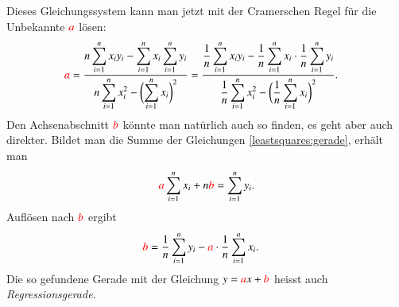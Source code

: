 Dieses Gleichungssystem kann man jetzt mit der Cramerschen Regel für die
Unbekannte ${\color{red}a}$ lösen:
\begin{align*}
{\color{red}a}
&=
\frac{\displaystyle
n\sum_{i=1}^n x_iy_i-\sum_{i=1}^nx_i\sum_{i=1}^ny_i
}{\displaystyle
n\sum_{i=1}^n x_i^2 -\biggl(\sum_{i=1}^n x_i\biggr)^2
}
=
\frac{\displaystyle
\frac1n\sum_{i=1}^n x_iy_i-\frac1n\sum_{i=1}^nx_i\cdot \frac1n\sum_{i=1}^ny_i
}{\displaystyle
\frac1n\sum_{i=1}^n x_i^2 -\biggl(\frac1n\sum_{i=1}^n x_i\biggr)^2
}.
\end{align*}
Den Achsenabschnitt $\color{red}b$ könnte man natürlich auch so finden,
es geht aber auch direkter.
Bildet man die Summe der Gleichungen 
\ref{leastsquares:gerade}, erhält man
\[
{\color{red}a}
\sum_{i=1}^n x_i
+
n{\color{red}b}
=
\sum_{i=1}^n y_i.
\]
Auflösen nach $\color{red}b$ ergibt
\begin{align*}
{\color{red}b}
&=
\frac1n\sum_{i=1}^n y_i
-{\color{red}a}
\cdot
\frac1n\sum_{i=1}^n x_i.
\end{align*}
Die so gefundene Gerade  mit der Gleichung
$y={\color{red}a}x+{\color{red}b}$
heisst auch {\em Regressionsgerade}.

